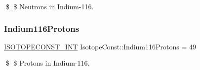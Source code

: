 \$ \$ Neutrons in Indium-\/116. \mbox{\label{group___isotope_const-_indium-_in116_gac44f2ba45c6d240e649d3f55d5697d7a}} 
\subsubsection{\texorpdfstring{Indium116\+Protons}{Indium116Protons}}
{\footnotesize\ttfamily \mbox{\hyperlink{group___isotope_const-_macros_ga5f18360b3e99483a35c32d789e62621c}{I\+S\+O\+T\+O\+P\+E\+C\+O\+N\+S\+T\+\_\+\+I\+NT}} Isotope\+Const\+::\+Indium116\+Protons = 49}

\$ \$ Protons in Indium-\/116. 